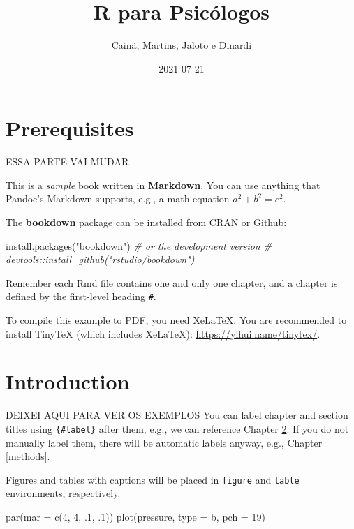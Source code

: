 \documentclass[
]{book}
\title{R para Psicólogos}
\author{Cainã, Martins, Jaloto e Dinardi}
\date{2021-07-21}
\newenvironment{Shaded}{\begin{snugshade}}{\end{snugshade}}
\newcommand{\AttributeTok}[1]{\textcolor[rgb]{0.77,0.63,0.00}{#1}}
\newcommand{\CommentTok}[1]{\textcolor[rgb]{0.56,0.35,0.01}{\textit{#1}}}
\newcommand{\DecValTok}[1]{\textcolor[rgb]{0.00,0.00,0.81}{#1}}
\newcommand{\FunctionTok}[1]{\textcolor[rgb]{0.00,0.00,0.00}{#1}}
\newcommand{\NormalTok}[1]{#1}
\newcommand{\StringTok}[1]{\textcolor[rgb]{0.31,0.60,0.02}{#1}}
\begin{document}
\maketitle

{
\setcounter{tocdepth}{1}
\tableofcontents
}
\hypertarget{prerequisites}{%
\chapter{Prerequisites}\label{prerequisites}}

ESSA PARTE VAI MUDAR

This is a \emph{sample} book written in \textbf{Markdown}. You can use anything that Pandoc's Markdown supports, e.g., a math equation \(a^2 + b^2 = c^2\).

The \textbf{bookdown} package can be installed from CRAN or Github:

\begin{Shaded}
\begin{Highlighting}[]
\FunctionTok{install.packages}\NormalTok{(}\StringTok{"bookdown"}\NormalTok{)}
\CommentTok{\# or the development version}
\CommentTok{\# devtools::install\_github("rstudio/bookdown")}
\end{Highlighting}
\end{Shaded}

Remember each Rmd file contains one and only one chapter, and a chapter is defined by the first-level heading \texttt{\#}.

To compile this example to PDF, you need XeLaTeX. You are recommended to install TinyTeX (which includes XeLaTeX): \url{https://yihui.name/tinytex/}.

\hypertarget{intro}{%
\chapter{Introduction}\label{intro}}

DEIXEI AQUI PARA VER OS EXEMPLOS
You can label chapter and section titles using \texttt{\{\#label\}} after them, e.g., we can reference Chapter \ref{intro}. If you do not manually label them, there will be automatic labels anyway, e.g., Chapter \ref{methods}.

Figures and tables with captions will be placed in \texttt{figure} and \texttt{table} environments, respectively.

\begin{Shaded}
\begin{Highlighting}[]
\FunctionTok{par}\NormalTok{(}\AttributeTok{mar =} \FunctionTok{c}\NormalTok{(}\DecValTok{4}\NormalTok{, }\DecValTok{4}\NormalTok{, .}\DecValTok{1}\NormalTok{, .}\DecValTok{1}\NormalTok{))}
\FunctionTok{plot}\NormalTok{(pressure, }\AttributeTok{type =} \StringTok{\textquotesingle{}b\textquotesingle{}}\NormalTok{, }\AttributeTok{pch =} \DecValTok{19}\NormalTok{)}
\end{Highlighting}
\end{Shaded}
\end{document}
